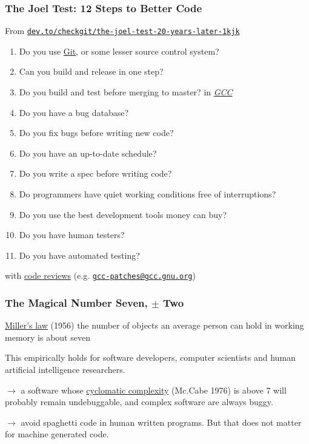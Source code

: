 \documentclass[xcolor=svgnames,final,smaller,a4]{beamer}
\begin{document}
 \begin{frame}
   \frametitle{The Joel Test: 12 Steps to Better Code}
   From \href{https://dev.to/checkgit/the-joel-test-20-years-later-1kjk}{\texttt{dev.to/checkgit/the-joel-test-20-years-later-1kjk}}
   \begin{relsize}{-1.0}
     \begin{enumerate}
       \item Do you use \href{http://git-scm.com/}{Git}, or some lesser source control system?
       \item Can you build and release in one step?
       \item Do you build and test before merging to master? \textcolor{red}{\texttt{}} in \href{https://gcc.gnu.org/}{\textit{GCC}}
    \item Do you have a bug database?
    \item Do you fix bugs before writing new code?
    \item Do you have an up-to-date schedule?
    \item Do you write a spec before writing code?
    \item Do programmers have quiet working conditions free of interruptions?
    \item Do you use the best development tools money can buy?
    \item Do you have human testers?
    \item Do you have automated testing?
     \end{enumerate}
   \end{relsize}
   with \href{https://en.wikipedia.org/wiki/Code_review}{code reviews}
   (e.g. \href{https://gcc.gnu.org/ml/gcc-patches/}{\texttt{gcc-patches@gcc.gnu.org}})
 \end{frame}

 \begin{frame}
   \frametitle{The Magical Number Seven, $\pm$ Two}

   \begin{block}{\href{https://en.wikipedia.org/wiki/The_Magical_Number_Seven,_Plus_or_Minus_Two}{Miller's law} (1956)}
     the number of objects an average person can hold in working
     memory is about seven
   \end{block}

   \bigskip
   
   This empirically holds for software developers, computer scientists
   and human artificial intelligence researchers.

   \medskip
   
   $\rightarrow$ a software whose
   \href{https://en.wikipedia.org/wiki/Cyclomatic_complexity}{cyclomatic
     complexity} (Mc.Cabe 1976) is above 7 will probably remain
   undebuggable, and complex software are always buggy.

   \medskip
   
   $\rightarrow$ avoid spaghetti code in human written programs. But that does not matter for machine generated code.

 \end{frame}
\end{document}

